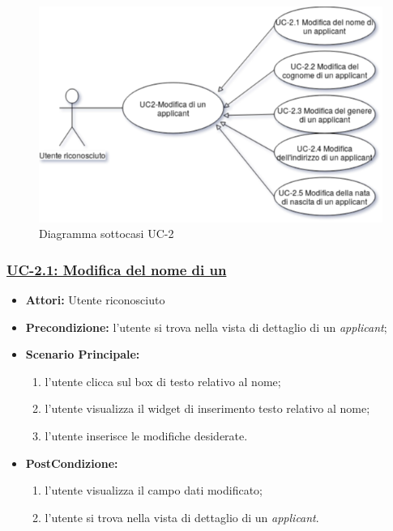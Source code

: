 \begin{figure}[!h] 
	\centering 
	\includegraphics[width=1\columnwidth]{immagini/usecase/UC3} 
	\caption{Diagramma sottocasi UC-2}
	\label{figura:uc-3}
\end{figure}


\subsubsection{\underline{UC-2.1: Modifica del nome di un \applicant}}
\begin{itemize}
	\item \textbf{Attori:} Utente riconosciuto
	\item \textbf{Precondizione:}  l'utente si trova nella vista di dettaglio di un \textit{applicant};
	\item \textbf{Scenario Principale:}
	\begin{enumerate}
		\item l'utente clicca sul box di testo relativo al nome;
		\item l'utente visualizza il  widget di inserimento testo relativo al nome;
		\item l'utente inserisce le modifiche desiderate.
	\end{enumerate}
	\item \textbf{PostCondizione:} 
	\begin{enumerate}
		\item l'utente visualizza il campo dati modificato;
		\item l'utente si trova nella vista di dettaglio di un \textit{applicant}.
	\end{enumerate}
	
\end{itemize}

